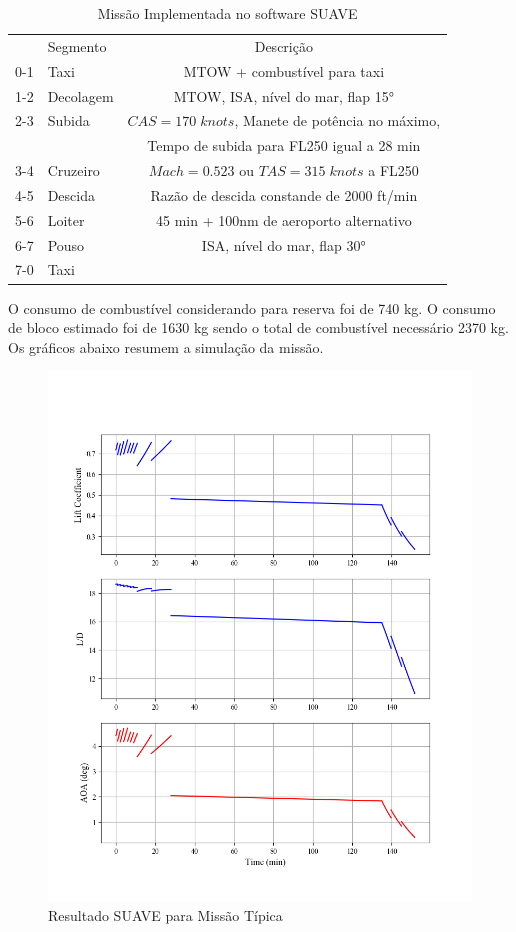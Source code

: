 \begin{table}[H]
\centering
\begin{tabular}{clc}
\toprule
    & Segmento & Descrição \\
0-1 & Taxi & MTOW + combustível para taxi\\
1-2 & Decolagem & MTOW, ISA, nível do mar, flap 15° \\
2-3 & Subida   & $CAS = 170 \; knots$, Manete de potência no máximo, \\
 & & Tempo de subida para FL250 igual a 28 min\\
3-4 & Cruzeiro & $Mach = 0.523$ ou $TAS = 315 \; knots$ a FL250\\
4-5 & Descida  & Razão de descida constande de 2000 ft/min \\
5-6 & Loiter   & 45 min + 100nm de aeroporto alternativo\\
6-7 & Pouso    & ISA, nível do mar, flap 30°\\
7-0 & Taxi     & \\
\bottomrule
\end{tabular}
\caption{Missão Implementada no software SUAVE}
\label{tbl:mission_suave}
\end{table}

O consumo de combustível considerando para reserva foi de 740 kg. O consumo de bloco estimado foi de 1630 kg sendo o total de combustível necessário 2370 kg. Os gráficos abaixo resumem a simulação da missão.


\begin{figure}[H]
\centering
\includegraphics[width=1.\textwidth]{images/parte4/aero0.png}
\caption{Resultado SUAVE para Missão Típica}
\label{fig:aero_mission}
\end{figure}

